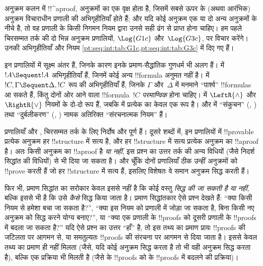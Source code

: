 \documentclass[../../../include/open-logic-section]{subfiles}
\begin{document}
अनुक्रम कलन में !!^a{proof}, अनुक्रमों का एक वृक्ष होता है, जिसमें सबसे ऊपर
के (अथवा आरंभिक) अनुक्रम विचाराधीन प्रणाली की अभिगृहीतियाँ होते हैं; और यदि
कोई अनुक्रम एक या दो अन्य अनुक्रमों के नीचे है, तो वह प्रणाली के किसी निगमन
नियम द्वारा उनसे सही ढंग से प्राप्त होना चाहिए। हम पहले चिरसम्मत तर्क की दो
भिन्न अनुक्रम प्रणालियों, $\Log{G1c}$ और~$\Log{G3c}$, पर विचार करेंगे। उनकी
अभिगृहीतियाँ और नियम \cref{pt:seq:int:tab:G1c,pt:seq:int:tab:G3c} में दिए
गए हैं। 




इन प्रणालियों में सूक्ष्म अंतर हैं, जिनके कारण इनके प्रमाण-सैद्धांतिक
गुणधर्म भी अलग हैं।  में $!A \Sequent !A$ अभिगृहीतियाँ हैं, जिनमें
कोई अन्य !!{formula} अनुमत नहीं है।  में $!C, \Gamma \Sequent
\Delta, !C$ रूप की अभिगृहीतियाँ हैं, जिनके $\Gamma$ और~$\Delta$ में मनमाने
``पार्श्व'' !!{formula}s आ सकते हैं, किंतु दोनों ओर आने वाला !!{formula}~$!C$
\emph{परमाण्विक} होना चाहिए।  में $\LeftR{\land}$ और
$\RightR{\lor}$ नियमों के दो-दो रूप हैं, जबकि  में प्रत्येक का केवल
एक रूप है। और  में ``संकुचन'' (\LeftR{\Contraction},
\RightR{\Contraction}) तथा ``दुर्बलीकरण'' (\LeftR{\Weakening},
\RightR{\Weakening}) नामक अतिरिक्त ``संरचनात्मक नियम'' हैं।

प्रणालियाँ  और , चिरसम्मत तर्क के लिए निर्दोष और पूर्ण
हैं। दूसरे शब्दों में, इन प्रणालियों में !!{provable} प्रत्येक अनुक्रम हर
!!{structure} में सत्य है, और हर !!{structure} में सत्य प्रत्येक अनुक्रम का
!!a{proof} है। अतः किसी अनुक्रम का !!a{proof} है \emph{या नहीं}, इस प्रश्न का
उत्तर तर्क की अन्य विधियों (जैसे निदर्श सिद्धांत की विधियों) से भी दिया जा
सकता है। और चूँकि दोनों प्रणालियाँ ठीक उन्हीं अनुक्रमों को !!{prove} करती हैं
जो हर !!{structure} में सत्य हैं, इसलिए विशेषतः वे समान अनुक्रम सिद्ध करती हैं।

फिर भी, प्रमाण सिद्धांत का सरोकार केवल इससे नहीं है कि कोई वस्तु
\emph{सिद्ध की जा सकती है या नहीं}, बल्कि इससे भी है कि उसे \emph{कैसे}
सिद्ध किया जाता है। प्रमाण सिद्धांतकार ऐसे प्रश्न देखते हैं: ``क्या किसी
नियम से हमेशा बचा जा सकता है?'', ``क्या इस नियम को प्रणाली में जोड़ा जा सकता
है, बिना किसी नए अनुक्रम को सिद्ध करने योग्य बनाए?'', या ``क्या एक प्रणाली
के !!{proof}s को दूसरी प्रणाली के !!{proof}s में बदला जा सकता है?'' यदि ऐसे
प्रश्न का उत्तर ``हाँ'' है, तो इस तथ्य का प्रमाण प्रायः !!{proof}s की जटिलता
पर आगमन से, या समतुल्यतः !!{proof}s की संरचना पर आगमन से दिया जाता है। इससे
केवल तथ्य का प्रमाण ही नहीं मिलता (जैसे, यदि  कोई अनुक्रम सिद्ध
करता है तो  भी वही अनुक्रम सिद्ध करता है), बल्कि एक प्रक्रिया भी
मिलती है (जैसे  के !!{proof}s को  के !!{proof}s में बदलने
की प्रक्रिया)।
\end{document}
